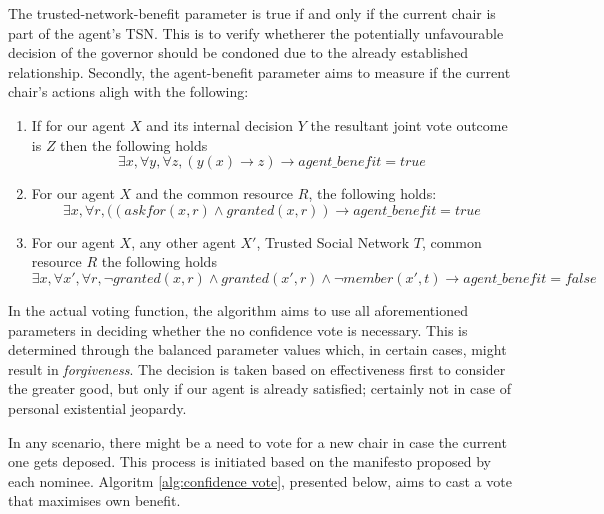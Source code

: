 The trusted-network-benefit parameter is true if and only if the current chair is part of the agent's TSN. This is to verify whetherer the potentially unfavourable decision of the governor should be condoned due to the already established relationship. Secondly, the agent-benefit parameter aims to measure if the current chair's actions aligh with the following:

\begin{enumerate}
    \item If for our agent $X$ and its internal decision $Y$ the resultant joint vote outcome is $Z$ then the following holds
    \begin{equation}
        \exists x, \forall y, \forall z, (y(x) \rightarrow z) \rightarrow agent\_benefit = true
    \end{equation}
    
    \item For our agent $X$ and the common resource $R$, the following holds:
    \begin{equation}
        \exists x, \forall r, ((askfor(x,r) \land granted(x,r)) \rightarrow agent\_benefit = true
    \end{equation}
    \item For our agent $X$, any other agent $X'$, Trusted Social Network $T$, common resource $R$ the following holds
    \begin{equation}
        \exists x, \forall x', \forall r, \neg granted(x,r) \land granted(x',r) \land \neg member(x',t) \rightarrow agent\_benefit = false
    \end{equation}
\end{enumerate}

In the actual voting function, the algorithm aims to use all aforementioned parameters in deciding whether the no confidence vote is necessary. This is determined through the balanced parameter values which, in certain cases, might result in \textit{forgiveness}. The decision is taken based on effectiveness first to consider the greater good, but only if our agent is already satisfied; certainly not in case of personal existential jeopardy.

In any scenario, there might be a need to vote for a new chair in case the current one gets deposed. This process is initiated based on the manifesto proposed by each nominee. Algoritm \ref{alg:confidence vote}, presented below, aims to cast a vote that maximises own benefit.

